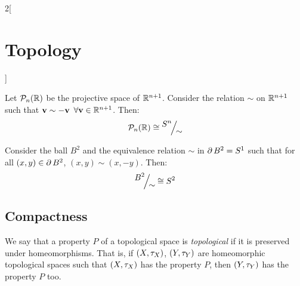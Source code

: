 \documentclass[../../../main.tex]{subfiles}
\begin{document}
\begin{multicols}{2}[\section{Topology}]
\begin{center}
\begin{minipage}{\linewidth}
      \label{TOP_klein}
    \end{minipage}
  \end{center}
  \begin{prop}
    Let $\mathcal{P}_n(\mathbb{R})$ be the projective space of $\mathbb{R}^{n+1}$. Consider the relation $\sim$ on $\mathbb{R}^{n+1}$ such that $\boldsymbol{\mathrm{v}}\sim -\boldsymbol{\mathrm{v}}$ $\forall \boldsymbol{\mathrm{v}}\in\mathbb{R}^{n+1}$. Then: $$\mathcal{P}_n(\RR)\cong\quot{S^n}{\sim}$$
  \end{prop}
  \begin{prop}\label{TOP_circle-sim}
    Consider the ball $B^2$ and the equivalence relation $\sim$ in $\operatorname{\partial} B^2=S^1$ such that for all $(x,y)\in \operatorname{\partial} B^2$, $(x,y)\sim(x,-y)$. Then: $$\quot{B^2}{\sim}\cong S^2$$
    \begin{center}
      \begin{minipage}{\linewidth}
        \centering
        
      \end{minipage}
    \end{center}
  \end{prop}
  \subsection{Compactness}
  \begin{definition}
    We say that a property $P$ of a topological space is \textit{topological} if it is preserved under homeomorphisms. That is, if $(X,\tau_X)$, $(Y,\tau_Y)$ are homeomorphic topological spaces such that $(X,\tau_X)$ has the property $P$, then $(Y,\tau_Y)$ has the property $P$ too.
  \end{definition}

\end{multicols}
\end{document}
